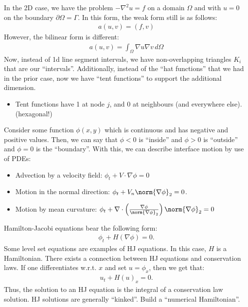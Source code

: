\documentclass{article}
\begin{document}
 In the 2D case, we have the problem $-\nabla^2 u = f$ on a domain $\Omega$ and with $u=0$ on the boundary $\partial \Omega = \Gamma$.
\gap
In this form, the weak form still is as follows:
\begin{align*}
  a(u, v) = (f, v)
\end{align*}
However, the bilinear form is different:
\begin{align*}
  a(u, v) = \int_{\Omega}\nabla u \nabla v \,d\Omega
\end{align*}
Now, instead of 1d line segment intervals, we have non-overlapping triangles $K_i$ that
are our ``intervals''. Additionally, instead of the  ``hat functions'' that we had in the
prior case, now we have ``tent functions'' to support the additional dimension.
\begin{itemize}
\item Tent functions have 1 at node $j$, and $0$ at neighbours (and everywhere else). (hexagonal!)
\end{itemize}

\pagebreak


Consider some function $\phi(x, y)$ which is continuous and has negative and positive
values. Then, we can say that $\phi < 0$ is ``inside'' and $\phi > 0$ is ``outside'' and
$\phi =0$ is the ``boundary''. With this, we can describe interface motion by use of PDEs:
\begin{itemize}
\item Advection by a velocity field: $\phi_t + V \cdot \nabla \phi = 0$
\item Motion in the normal direction: $\phi_t + V_n \norm{\nabla \phi}_2 = 0$.
\item Motion by mean curvature: $\phi_t + \nabla \cdot \left(\frac{\nabla \phi}{\norm{\nabla \phi}_2}\right) \norm{\nabla \phi}_2 = 0$
\end{itemize}

 Hamilton-Jacobi equations bear the following form:
\begin{align*}
  \phi_t + H(\nabla\phi) = 0.
\end{align*}
Some level set equations are examples of HJ equations. In this case, $H$ is a Hamiltonian.
\gap
There exists a connection between HJ equations and conservation laws. If one differentiates
w.r.t. $x$ and set $u = \phi_x$, then we get that:
\begin{align*}
  u_t + H(u)_x = 0.
\end{align*}
Thus, the solution to an HJ equation is the integral of a conservation law solution. HJ
solutions are generally ``kinked''.
\gap
{} Build a ``numerical Hamiltonian''.
\bigskip\\
\end{document}
